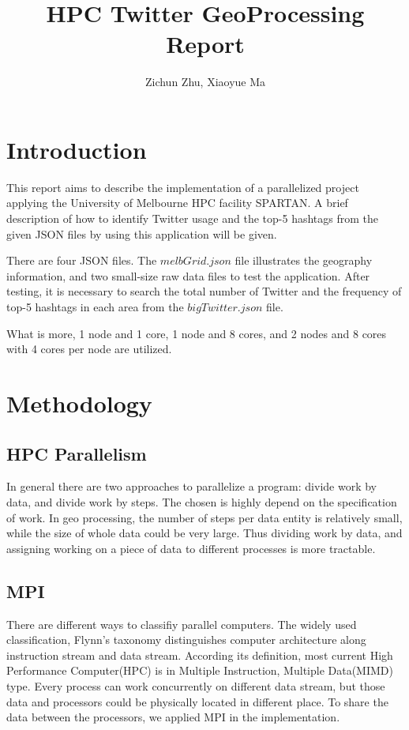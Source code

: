 \documentclass[11pt]{article}
\title{HPC Twitter GeoProcessing Report}
\author
{Zichun Zhu, Xiaoyue Ma}
\begin{document}
\maketitle


\section{Introduction}
This report aims to describe the implementation of a parallelized project applying the University of Melbourne HPC facility SPARTAN. A brief description of how to identify Twitter usage and the top-5 hashtags from the given JSON files by using this application will be given.

There are four JSON files. The $melbGrid.json$ file illustrates the geography information, and two small-size raw data files to test the application. After testing, it is necessary to search the total number of Twitter and the frequency of top-5 hashtags in each area from the $bigTwitter.json$ file.

What is more, 1 node and 1 core, 1 node and 8 cores, and 2 nodes and 8 cores with 4 cores per node are utilized.

\section{Methodology}

\subsection{HPC Parallelism}
In general there are two approaches to parallelize a program: divide work by data, and divide work by steps. The chosen is highly depend on the specification of work. In geo processing, the number of steps per data entity is relatively small, while the size of whole data could be very large. Thus dividing work by data, and assigning working on a piece of data to different processes is more tractable.

\subsection{MPI}
There are different ways to classifiy parallel computers. The widely used classification, Flynn's taxonomy distinguishes computer architecture along instruction stream and data stream. According its definition, most current High Performance Computer(HPC) is in Multiple Instruction, Multiple Data(MIMD) type. Every process can work concurrently on different data stream, but those data and processors could be physically located in different place. To share the data between the processors,  we applied MPI in the implementation.
\end{document}
